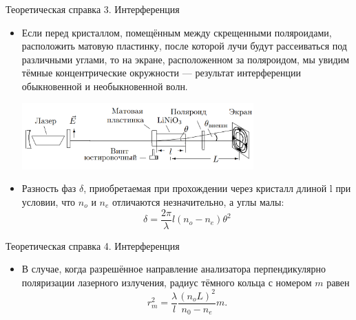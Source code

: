 \documentclass[11pt]{beamer} %
\begin{document}
     \begin{frame}{Теоретическая справка 3. Интерференция}
        \small

        \begin{itemize}
        \item Если перед кристаллом, помещённым между скрещенными поляроидами, расположить матовую пластинку, после которой лучи будут рассеиваться под различными углами, то на экране, расположенном за поляроидом, мы увидим тёмные концентрические окружности — результат интерференции обыкновенной и необыкновенной волн.
        \begin{center}
             \includegraphics[width=0.7\textwidth]{images/1.png}
        \end{center}
       
        
        \item Разность фаз $\delta$, приобретаемая при прохождении через кристалл длиной l при условии, что $n_o$ и $n_e$ отличаются незначительно, а углы малы:
        \begin{equation}
            \label{eq:squredR_m}
            \delta = \frac{2\pi}{\lambda}l(n_o - n_e)\theta^2
        \end{equation}

        
       
        \end{itemize}
       
    \end{frame}

    \begin{frame}{Теоретическая справка 4. Интерференция}
        \begin{itemize}
            \item В случае, когда разрешённое направление анализатора перпендикулярно поляризации лазерного излучения, радиус тёмного кольца с номером $m$ равен
            \begin{equation}
                \label{eq:squredR_m}
                r_m^2 = \dfrac{\lambda}{l} \dfrac{(n_oL)^2}{n_0 - n_e}m.
            \end{equation}
        \end{itemize}
    \end{frame}
\end{document}
